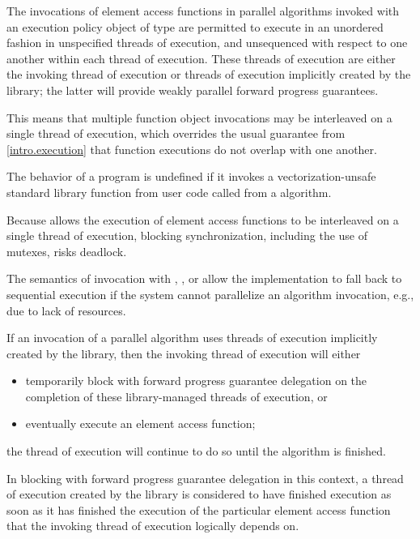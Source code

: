 \pnum
The invocations of element access functions in parallel algorithms invoked with
an execution policy object of type  are
permitted to execute
in an unordered fashion in unspecified threads of execution, and
unsequenced with respect to one another within each thread of execution.
These threads of execution are
either the invoking thread of execution
or threads of execution implicitly created by the library;
the latter will provide weakly parallel forward progress guarantees.
\begin{note}
This means that multiple function object invocations may be interleaved
on a single thread of execution,
which overrides the usual guarantee from \ref{intro.execution}
that function executions do not overlap with one another.
\end{note}
The behavior of a program is undefined if
it invokes a vectorization-unsafe standard library function
from user code
called from a  algorithm.
\begin{note}
Because  allows
the execution of element access functions
to be interleaved on a single thread of execution,
blocking synchronization, including the use of mutexes, risks deadlock.
\end{note}

\pnum
\begin{note}
The semantics of invocation with
,
, or
allow the implementation to fall back to sequential execution
if the system cannot parallelize an algorithm invocation,
e.g., due to lack of resources.
\end{note}

\pnum
If an invocation of a parallel algorithm uses threads of execution
implicitly created by the library,
then the invoking thread of execution will either
\begin{itemize}
\item
  temporarily block
  with forward progress guarantee delegation
  on the completion of these library-managed threads of execution, or
\item
  eventually execute an element access function;
\end{itemize}
the thread of execution will continue to do so until the algorithm is finished.
\begin{note}
In blocking with forward progress guarantee delegation in this context,
a thread of execution created by the library
is considered to have finished execution
as soon as it has finished the execution
of the particular element access function
that the invoking thread of execution logically depends on.
\end{note}

